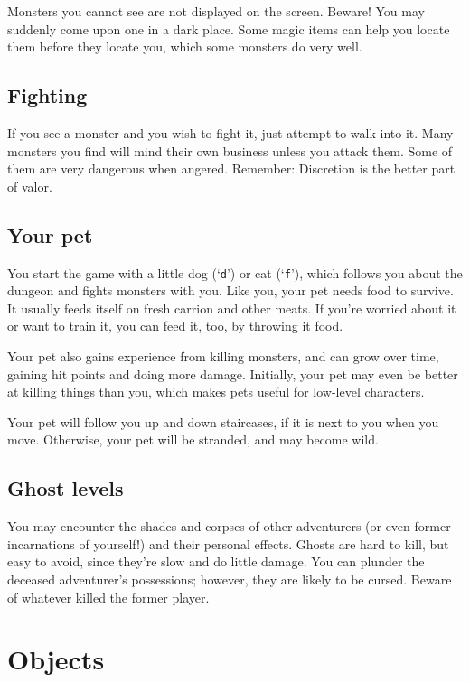 Monsters you cannot see are not displayed on the screen.  Beware!
You may suddenly come upon one in a dark place.  Some magic items can
help you locate them before they locate you, which some monsters do
very well.

\subsection*{Fighting}

If you see a monster and you wish to fight it, just attempt to walk
into it.  Many monsters you find will mind their own business unless
you attack them.  Some of them are very dangerous when angered.
Remember:  Discretion is the better part of valor.

\subsection*{Your pet}

You start the game with a little dog (`{\tt d}') or cat (`{\tt f}'),
which follows
you about the dungeon and fights monsters with you.  Like you, your
pet needs food to survive.  It usually feeds itself on fresh carrion
and other meats.  If you're worried about it or want to train it, you
can feed it, too, by throwing it food.

Your pet also gains experience from killing monsters, and can grow
over time, gaining hit points and doing more damage.  Initially, your
pet may even be better at killing things than you, which makes pets
useful for low-level characters.

Your pet will follow you up and down staircases, if it is next to you
when you move.  Otherwise, your pet will be stranded, and may become
wild.

\subsection*{Ghost levels}

You may encounter the shades and corpses of other adventurers (or even
former incarnations of yourself!) and their personal effects.  Ghosts
are hard to kill, but easy to avoid, since they're slow and do little
damage.  You can plunder the deceased adventurer's possessions;
however, they are likely to be cursed.  Beware of whatever killed the
former player.

\section{Objects}

